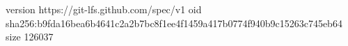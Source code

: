 version https://git-lfs.github.com/spec/v1
oid sha256:b9fda16bea6b4641c2a2b7bc8f1ee4f1459a417b0774f940b9c15263c745eb64
size 126037
